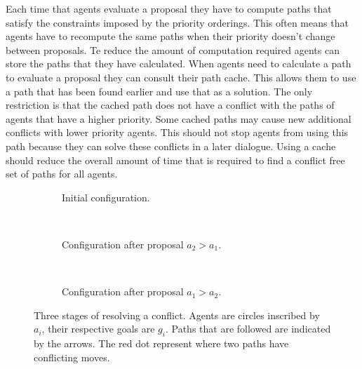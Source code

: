 Each time that agents evaluate a proposal they have to compute paths that
satisfy the constraints imposed by the priority orderings. This often means
that agents have to recompute the same paths when their priority doesn't change
between proposals. Te reduce the amount of computation required agents can
store the paths that they have calculated. When agents need to calculate a path
to evaluate a proposal they can consult their path cache. This allows them to
use a path that has been found earlier and use that as a solution. The only
restriction is that the cached path does not have a conflict with the paths of
agents that have a higher priority. Some cached paths may cause new additional
conflicts with lower priority agents. This should not stop agents from using
this path because they can solve these conflicts in a later dialogue. Using a
cache should reduce the overall amount of time that is required to find a
conflict free set of paths for all agents.

\begin{figure}
    \centering
    \begin{subfigure}[t]{.3\textwidth}
        \centering
        \def\svgscale{.6}
        
        \caption{Initial configuration.}
        \label{fig:example-initial}
    \end{subfigure}
    ~
    \begin{subfigure}[t]{.3\textwidth}
        \centering
        \def\svgscale{.6}
        
        \caption{Configuration after proposal $a_2 > a_1$.}
        \label{fig:example-prop1}
    \end{subfigure}
    ~
    \begin{subfigure}[t]{.3\textwidth}
        \centering
        \def\svgscale{.6}
        
        \caption{Configuration after proposal $a_1 > a_2$.}
        \label{fig:example-solution}
    \end{subfigure}
    \caption{Three stages of resolving a conflict. Agents are circles inscribed
    by $a_i$, their respective goals are $g_i$. Paths that are followed are
    indicated by the arrows. The red dot represent where two paths have
    conflicting moves.}
    \label{fig:example}
\end{figure}

